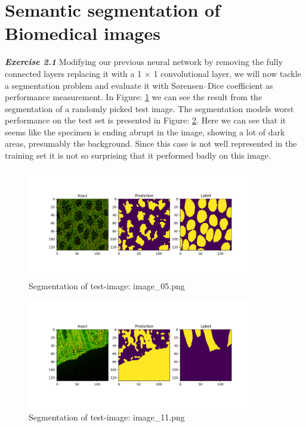 \documentclass[a4paper,10pt]{article}
\begin{document}
\newpage
\section{Semantic segmentation of Biomedical images}

\textit{\textbf{Exercise 2.1}} Modifying our previous neural network by removing the fully connected layers replacing it with a 1 $\times$ 1 convolutional layer, we will now tackle a segmentation problem and evaluate it with Sørensen–Dice coefficient as performance measurement. In Figure: \ref{fig:segexample} we can see the result from the segmentation of a randomly picked test image. The segmentation models worst performance on the test set is presented in Figure: \ref{fig:worst}. Here we can see that it seems like the specimen is ending abrupt in the image, showing a lot of dark areas, presumably the background. Since this case is not well represented in the training set it is not so surprising that it performed badly on this image. 

\begin{figure}[ht!]
\centering
\includegraphics[width=100mm]{figures/assignment_3/segmentation_test4.png}
\caption{Segmentation of test-image: image\_05.png}
\label{fig:segexample}
\end{figure}

\begin{figure}[ht!]
\centering
\includegraphics[width=100mm]{figures/assignment_3/segmentation_worst.png}
\caption{Segmentation of test-image: image\_11.png}
\label{fig:worst}
\end{figure}
\end{document}
